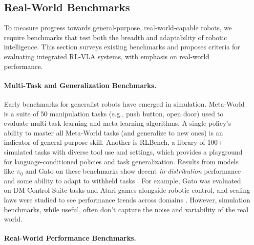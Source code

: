 \subsection{Real-World Benchmarks}

To measure progress towards general-purpose, real-world-capable robots, we require benchmarks that test both the breadth and adaptability of robotic intelligence. This section surveys existing benchmarks and proposes criteria for evaluating integrated \ac{RL}-\ac{VLA} systems, with emphasis on real-world performance.

\paragraph{Multi-Task and Generalization Benchmarks.}

Early benchmarks for generalist robots have emerged in simulation. Meta-World is a suite of 50 manipulation tasks (e.g., push button, open door) used to evaluate multi-task learning and meta-learning algorithms. A single policy’s ability to master all Meta-World tasks (and generalize to new ones) is an indicator of general-purpose skill. Another is RLBench, a library of 100+ simulated tasks with diverse tool use and settings, which provides a playground for language-conditioned policies and task generalization. Results from models like $\pi_0$ and Gato on these benchmarks show decent \textit{in-distribution} performance and some ability to adapt to withheld tasks \cite{GATO2022, PI02024}. For example, Gato was evaluated on DM Control Suite tasks and Atari games alongside robotic control, and scaling laws were studied to see performance trends across domains \cite{GATO2022}. However, simulation benchmarks, while useful, often don’t capture the noise and variability of the real world.

\paragraph{Real-World Performance Benchmarks.}

